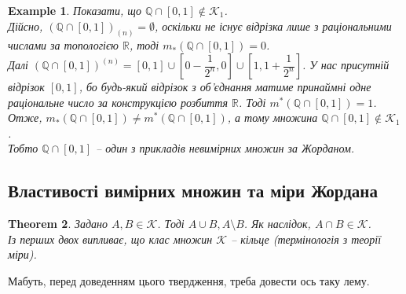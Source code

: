 \documentclass[a4paper, 10pt]{article}
\theoremstyle{theoremdd}
\newtheorem{theorem}{Theorem}[subsection]
\theoremstyle{theoremdd}
\theoremstyle{theoremdd}
\theoremstyle{theoremdd}
\newtheorem{example}[theorem]{Example}
\theoremstyle{theoremdd}
\theoremstyle{theoremdd}
\theoremstyle{theoremdd}
\theoremstyle{theoremdd}
\begin{document}
\begin{example}
Показати, що $\mathbb{Q} \cap [0,1] \not\in \mathcal{K}_1$.\\
Дійсно, $\left(\mathbb{Q} \cap [0,1] \right)_{(n)} = \emptyset$, оскільки не існує відрізка лише з раціональними числами за топологією $\mathbb{R}$, тоді $m_*(\mathbb{Q} \cap [0,1]) = 0$.\\
Далі $\left( \mathbb{Q} \cap [0,1] \right)^{(n)} = [0,1] \cup \left[ 0 - \dfrac{1}{2^n}, 0 \right] \cup \left[ 1, 1 + \dfrac{1}{2^n} \right]$. У нас присутній відрізок $[0,1]$, бо будь-який відрізок з об'єднання матиме принаймні одне раціональне число за конструкцією розбиття $\mathbb{R}$. Тоді $m^*(\mathbb{Q} \cap [0,1]) = 1$.\\
Отже, $m_*(\mathbb{Q} \cap [0,1]) \neq m^*(\mathbb{Q} \cap [0,1])$, а тому множина $\mathbb{Q} \cap [0,1] \not\in \mathcal{K}_1$.\\
Тобто $\mathbb{Q} \cap [0,1]$ -- один з прикладів невимірних множин за Жорданом.
\end{example}

\subsection{Властивості вимірних множин та міри Жордана}
\begin{theorem}
Задано $A,B \in \mathcal{K}$. Тоді $A \cup B, A \setminus B$. Як наслідок, $A \cap B \in \mathcal{K}$.\\
Із перших двох випливає, що клас множин $\mathcal{K}$ -- кільце (термінологія з теорії міри).
\end{theorem}

Мабуть, перед доведенням цього твердження, треба довести ось таку лему.
\end{document}
